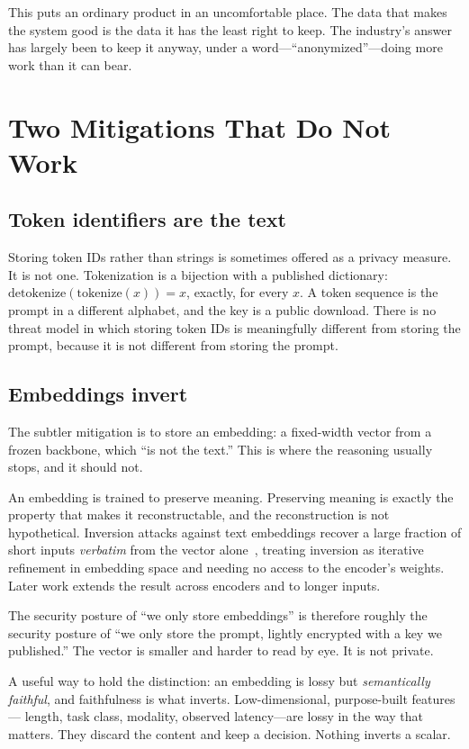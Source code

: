 \documentclass[11pt,a4paper]{article}
\begin{document}
This puts an ordinary product in an uncomfortable place. The data that makes the system
good is the data it has the least right to keep. The industry's answer has largely been to
keep it anyway, under a word---``anonymized''---doing more work than it can bear.

\section{Two Mitigations That Do Not Work}

\subsection{Token identifiers are the text}

Storing token IDs rather than strings is sometimes offered as a privacy measure. It is not
one. Tokenization is a bijection with a published dictionary: $\mathrm{detokenize}(\mathrm{tokenize}(x)) = x$,
exactly, for every $x$. A token sequence is the prompt in a different alphabet, and the
key is a public download. There is no threat model in which storing token IDs is
meaningfully different from storing the prompt, because it is not different from storing
the prompt.

\subsection{Embeddings invert}

The subtler mitigation is to store an embedding: a fixed-width vector from a frozen
backbone, which ``is not the text.'' This is where the reasoning usually stops, and it
should not.

An embedding is trained to preserve meaning. Preserving meaning is exactly the property
that makes it reconstructable, and the reconstruction is not hypothetical. Inversion
attacks against text embeddings recover a large fraction of short inputs \emph{verbatim}
from the vector alone~\cite{vec2text}, treating inversion as iterative refinement in
embedding space and needing no access to the encoder's weights. Later work extends the
result across encoders and to longer inputs.

The security posture of ``we only store embeddings'' is therefore roughly the security
posture of ``we only store the prompt, lightly encrypted with a key we published.'' The
vector is smaller and harder to read by eye. It is not private.

A useful way to hold the distinction: an embedding is lossy but \emph{semantically
faithful}, and faithfulness is what inverts. Low-dimensional, purpose-built features---
length, task class, modality, observed latency---are lossy in the way that matters. They
discard the content and keep a decision. Nothing inverts a scalar.
\end{document}

